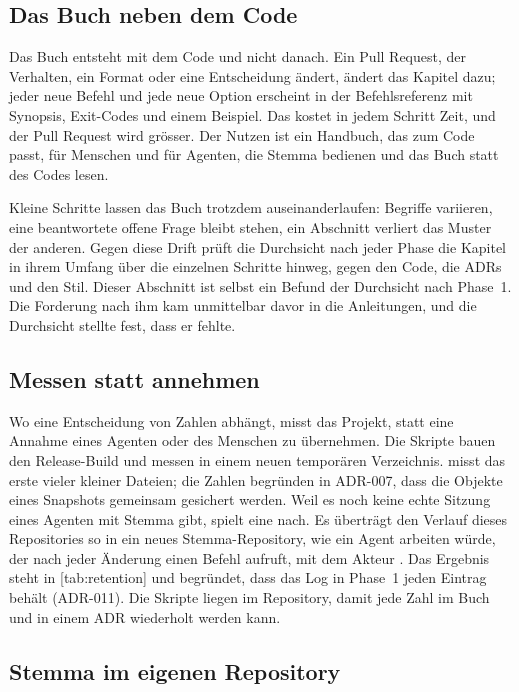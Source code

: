 \subsection{Das Buch neben dem Code}

Das Buch entsteht mit dem Code und nicht danach.
Ein Pull Request, der Verhalten, ein Format oder eine Entscheidung ändert,
ändert das Kapitel dazu; jeder neue Befehl und jede neue Option
erscheint in der Befehlsreferenz mit Synopsis, Exit-Codes und einem Beispiel.
Das kostet in jedem Schritt Zeit, und der Pull Request wird grösser.
Der Nutzen ist ein Handbuch, das zum Code passt,
für Menschen und für Agenten, die Stemma bedienen und das Buch statt des Codes lesen.

Kleine Schritte lassen das Buch trotzdem auseinanderlaufen:
Begriffe variieren, eine beantwortete offene Frage bleibt stehen,
ein Abschnitt verliert das Muster der anderen.
Gegen diese Drift prüft die Durchsicht nach jeder Phase die Kapitel in ihrem Umfang
über die einzelnen Schritte hinweg, gegen den Code, die ADRs und den Stil.
Dieser Abschnitt ist selbst ein Befund der Durchsicht nach Phase~1.
Die Forderung nach ihm kam unmittelbar davor in die Anleitungen,
und die Durchsicht stellte fest, dass er fehlte.

\subsection{Messen statt annehmen}

Wo eine Entscheidung von Zahlen abhängt, misst das Projekt,
statt eine Annahme eines Agenten oder des Menschen zu übernehmen.
Die Skripte  bauen den Release-Build
und messen in einem neuen temporären Verzeichnis.
 misst das erste  vieler kleiner Dateien;
die Zahlen begründen in ADR-007, dass die Objekte eines Snapshots gemeinsam gesichert werden.
Weil es noch keine echte Sitzung eines Agenten mit Stemma gibt,
spielt  eine nach.
Es überträgt den Verlauf dieses Repositories so in ein neues Stemma-Repository,
wie ein Agent arbeiten würde, der nach jeder Änderung einen Befehl aufruft,
mit dem Akteur .
Das Ergebnis steht in [tab:retention] und begründet,
dass das Log in Phase~1 jeden Eintrag behält (ADR-011).
Die Skripte liegen im Repository,
damit jede Zahl im Buch und in einem ADR wiederholt werden kann.

\subsection[sec:case-study]{Stemma im eigenen Repository}

